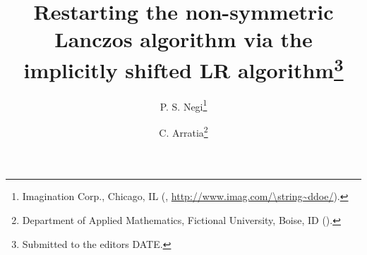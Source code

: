 

\usepackage{lipsum}
\usepackage{amsfonts}
\usepackage{graphicx}
\usepackage{epstopdf}
\usepackage{algorithmic}
\usepackage{amsmath}
\ifpdf
\else
\fi

\newcommand{\creflastconjunction}{, and~}



\title{Restarting the non-symmetric Lanczos algorithm via the implicitly shifted LR algorithm\thanks{Submitted to the editors DATE.
}}

\author{P. S. Negi\thanks{Imagination Corp., Chicago, IL 
  (, \url{http://www.imag.com/\string~ddoe/}).}
\and C. Arratia\thanks{Department of Applied Mathematics, Fictional University, Boise, ID 
  ().}
}

\usepackage{amsopn}
\DeclareMathOperator{\diag}{diag}


